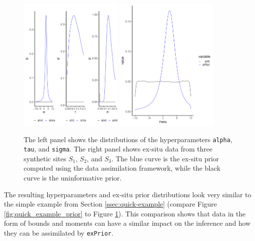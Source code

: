 \begin{figure}
    \centering
    \includegraphics[width=0.45\textwidth]{img/example_4_hyperDist.pdf}
    \includegraphics[width=0.45\textwidth]{img/example_4_exPrior.pdf}
    \caption{The left panel shows the distributions of the hyperparameters \texttt{alpha}, \texttt{tau}, and \texttt{sigma}. The right panel shows ex-situ data from three synthetic sites $S_1$, $S_2$, and $S_3$. The blue curve is the ex-situ prior computed using the data assimilation framework, while the black curve is the uninformative prior.}
    \label{fig:exdata_multiple_prior}
\end{figure}

The resulting hyperparameters and ex-situ prior distributions look very similar to the simple example from Section \ref{ssec:quick-example} (compare Figure \ref{fig:quick_example_prior} to Figure \ref{fig:exdata_multiple_prior}). 
This comparison shows that data in the form of bounds and moments can have a similar impact on the inference and how they can be assimilated by \texttt{exPrior}.


